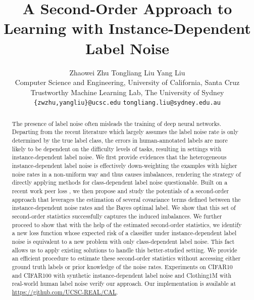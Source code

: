 \documentclass[final]{cvpr}
\begin{document}
\title{A Second-Order Approach to Learning with Instance-Dependent Label Noise}



\author{Zhaowei Zhu \quad Tongliang Liu \quad  Yang Liu\\
Computer Science and Engineering, University of California, Santa Cruz \\ Trustworthy Machine Learning Lab, The University of Sydney\\
{\tt\small \{zwzhu,yangliu\}@ucsc.edu}
\quad
{\tt\small tongliang.liu@sydney.edu.au}
}

\maketitle
\pagestyle{empty}  \thispagestyle{empty} 

\begin{abstract}
The presence of label noise often misleads the training of deep neural networks. Departing from the recent literature which largely assumes the label noise rate is only determined by the true label class, the errors in human-annotated labels are more likely to be dependent on the difficulty levels of tasks, resulting in settings with instance-dependent label noise. We first provide evidences that the heterogeneous instance-dependent label noise is effectively down-weighting the examples with higher noise rates in a non-uniform way and thus causes imbalances, rendering the strategy of directly applying methods for class-dependent label noise questionable. Built on a recent work peer loss \cite{liu2019peer}, we then propose and study the potentials of a second-order approach that leverages the estimation of several covariance terms defined between the instance-dependent noise rates and the Bayes optimal label. We show that this set of second-order statistics successfully captures the induced imbalances. We further proceed to show that with the help of the estimated second-order statistics, we identify a new loss function whose expected risk of a classifier under instance-dependent label noise is equivalent to a new problem with only class-dependent label noise. This fact allows us to apply existing solutions to handle this better-studied setting. We provide an efficient procedure to estimate these second-order statistics without accessing either ground truth labels or prior knowledge of the noise rates. Experiments on CIFAR10 and CIFAR100 with synthetic instance-dependent label noise and Clothing1M with real-world human label noise verify our approach. Our implementation is available at \url{https://github.com/UCSC-REAL/CAL}.
\end{abstract}
\end{document}
